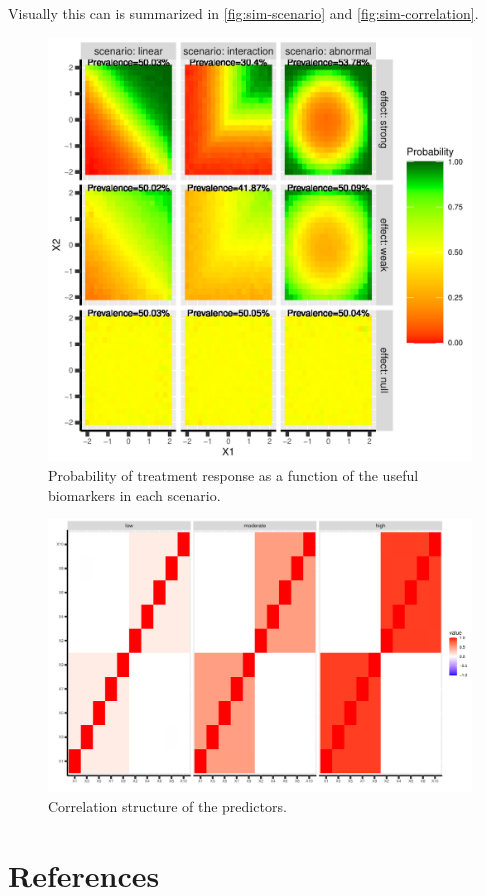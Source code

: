 \documentclass[12pt]{article}
\begin{document}
Visually this can is summarized in \autoref{fig:sim-scenario} and  \autoref{fig:sim-correlation}.
\begin{figure}[htbp]
\centering
\includegraphics[width=1\textwidth]{./Figures/fig-scenario.pdf}
\caption{\label{fig:sim-scenario}Probability of treatment response as a function of the useful biomarkers in each scenario.}
\end{figure}

\begin{figure}[htbp]
\centering
\includegraphics[width=1\textwidth]{./Figures/fig-correlation.pdf}
\caption{\label{fig:sim-correlation}Correlation structure of the predictors.}
\end{figure}


\section{References}
\label{sec:orgf3e825d}
\begingroup
\renewcommand{\section}[2]{}



\endgroup
\end{document}

